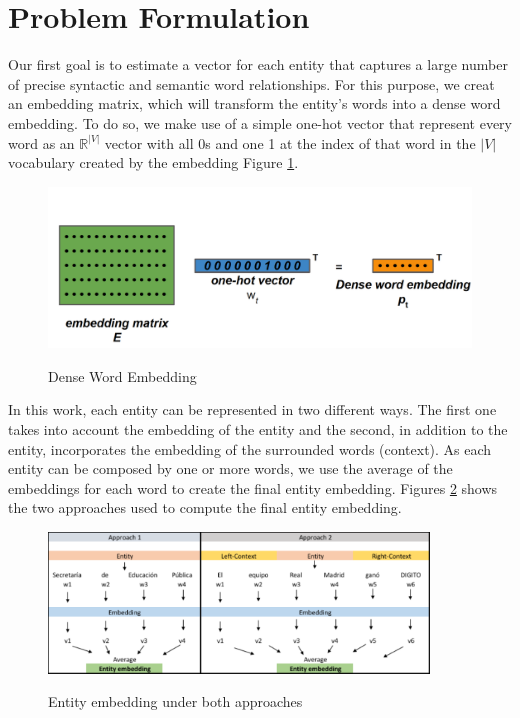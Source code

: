 \documentclass[]{article}
\begin{document}
\section{Problem Formulation}
Our first goal is to estimate a vector for each entity that captures a large number of precise syntactic and semantic word relationships. For this purpose, we creat an embedding matrix, which will transform the entity's words into a dense word embedding.  To do so, we make use of a simple one-hot vector that represent every word as an $\mathbb{R}^{|V|}$ vector with all 0s and one 1 at the index of that word in the $|V|$ vocabulary created by the embedding Figure \ref{fig:DE}.

\begin{figure}[h]
	\caption{Dense Word Embedding}
	\centering
	\includegraphics[width=1\textwidth]{Figures/Embeddings}
	\label{fig:DE}
\end{figure}


In this work, each entity can be represented in two different ways. The first one takes into account the embedding of the entity and the second, in addition to the entity, incorporates the embedding of the surrounded words (context). As each entity can be composed by one or more words, we use the average of the embeddings for each word to create the final entity embedding. Figures \ref{fig:gull} shows the two approaches used to compute the final entity embedding.  

\begin{figure}[h]
	\caption{Entity embedding under both approaches }
	\centering
	\includegraphics[width=0.9\textwidth]{Figures/EntityEmb}
	\label{fig:gull}
\end{figure}
\end{document}
